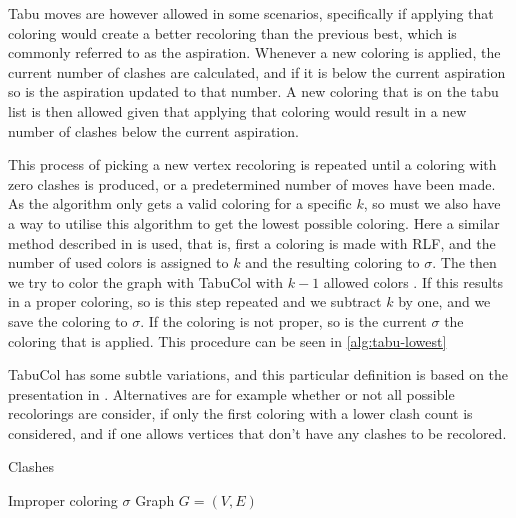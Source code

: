 \documentclass[a4paper]{article}
\begin{document}
Tabu moves are however allowed in some scenarios, specifically if applying that
coloring would create a better recoloring than the previous best, which is
commonly referred to as the aspiration. Whenever a new coloring is applied, the
current number of clashes are calculated, and if it is below the current
aspiration so is the aspiration updated to that number.  A new coloring that is
on the tabu list is then allowed given that applying that coloring would result
in a new number of clashes below the current aspiration.

This process of picking a new vertex recoloring is repeated until a coloring
with zero clashes is produced, or a predetermined number of moves have been
made. As the algorithm only gets a valid coloring for a specific $k$, so must
we also have a way to utilise this algorithm to get the lowest possible
coloring.  Here a similar method described in \cite{Constructive} is used, that
is, first a coloring is made with RLF, and the number of used colors is assigned
to $k$ and the resulting coloring to $\sigma$.  The then we try to color the
graph with TabuCol with $k-1$ allowed colors . If this results in a proper
coloring, so is this step repeated and we subtract $k$ by one, and we save the
coloring to $\sigma$.  If the coloring is not proper, so is the current $\sigma$
the coloring that is applied.  This procedure can be seen in
\autoref{alg:tabu-lowest}


TabuCol has some subtle variations, and this particular definition is based on
the presentation in \cite{Constructive}. Alternatives are for example whether or
not all possible recolorings are consider, if only the first coloring with a
lower clash count is considered, and if one allows vertices that don't have any
clashes to be recolored.

\begin{algorithm}[H]
    \caption{Clashes}
    \begin{algorithmic}[1]
        \REQUIRE Improper coloring $\sigma$
        \REQUIRE Graph $G = (V,E)$
    \end{algorithmic}
\end{algorithm}
\end{document}
